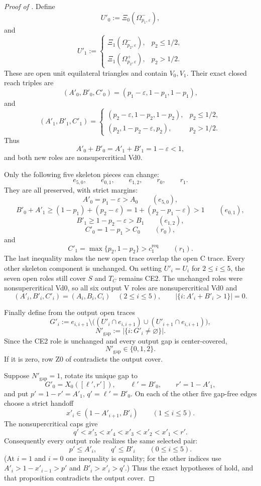 \begin{proof}[Proof of ]
Define
\[
 U'_0:=\Xi_0(\Omega_{p_1,\varepsilon}^-),
\]
and
\[
 U'_1:=
 \begin{cases}
  \Xi_1(\Omega_{p_2,\varepsilon}^-),&p_2\le1/2,\\
  \Xi_1(\Omega_{p_2,\varepsilon}^+),&p_2>1/2.
 \end{cases}
\]
These are open unit equilateral triangles and contain $V_0,V_1$.  Their
exact closed reach triples are
\[
 (A'_0,B'_0,C'_0)=(p_1-\varepsilon,1-p_1,1-p_1),
\]
and
\[
 (A'_1,B'_1,C'_1)=
 \begin{cases}
 (p_2-\varepsilon,1-p_2,1-p_2),&p_2\le1/2,\\
 (p_2,1-p_2-\varepsilon,p_2),&p_2>1/2.
 \end{cases}
\]
Thus
\[
 A'_0+B'_0=A'_1+B'_1=1-\varepsilon<1,
\]
and both new roles are nonsupercritical Vd0.

Only the following five skeleton pieces can change:
\[
 e_{5,0},\qquad e_{0,1},\qquad e_{1,2},\qquad r_0,\qquad r_1.
\]
They are all preserved, with strict margins:
\[
 A'_0=p_1-\varepsilon>A_0
 \qquad(e_{5,0}),
\]
\[
 B'_0+A'_1
 \ge(1-p_1)+(p_2-\varepsilon)
 =1+(p_2-p_1-\varepsilon)>1
 \qquad(e_{0,1}),
\]
\[
 B'_1\ge1-p_2-\varepsilon>B_1
 \qquad(e_{1,2}),
\]
\[
 C'_0=1-p_1>C_0
 \qquad(r_0),
\]
and
\[
 C'_1=\max\{p_2,1-p_2\}>c_1^{\mathrm{req}}
 \qquad(r_1).
\]
The last inequality makes the new open trace overlap the open C trace.
Every other skeleton component is unchanged.  On setting $U'_i=U_i$ for
$2\le i\le5$, the seven open roles still cover $S$ and $T_C$ remains CE2.
The unchanged roles were nonsupercritical Vd0, so all six output V roles are
nonsupercritical Vd0 and
\[
 (A'_i,B'_i,C'_i)=(A_i,B_i,C_i)\quad(2\le i\le5),
 \qquad
 \bigl|\{i:A'_i+B'_i>1\}\bigr|=0.
\]

Finally define from the output open traces
\[
 G'_i:=e_{i,i+1}\setminus
 \bigl((U'_i\cap e_{i,i+1})\cup(U'_{i+1}\cap e_{i,i+1})\bigr),
\]
\[
 N'_{\mathrm{gap}}:=\bigl|\{i:G'_i\ne\varnothing\}\bigr|.
\]
Since the CE2 role is unchanged and every output gap is center-covered,
\[
 N'_{\mathrm{gap}}\in\{0,1,2\}.
\]
If it is zero, row Z0 of  contradicts the output
cover.

Suppose $N'_{\mathrm{gap}}=1$, rotate its unique gap to
\[
 G'_0=X_0([\ell',r']),
 \qquad \ell'=B'_0,
 \qquad r'=1-A'_1,
\]
and put $p'=1-r'=A'_1$, $q'=\ell'=B'_0$.  On each of the other five
gap-free edges choose a strict handoff
\[
 x'_i\in(1-A'_{i+1},B'_i)
 \qquad(1\le i\le5).
\]
The nonsupercritical caps give
\[
 q'<x'_5<x'_4<x'_3<x'_2<x'_1<r'.
\]
Consequently every output role realizes the same selected pair:
\[
 p'\le A'_i,
 \qquad q'\le B'_i
 \qquad(0\le i\le5).
\]
(At $i=1$ and $i=0$ one inequality is equality; for the other indices use
$A'_i>1-x'_{i-1}>p'$ and $B'_i>x'_i>q'$.)  Thus the exact hypotheses of
 hold, and that proposition
contradicts the output cover.


\end{proof}
